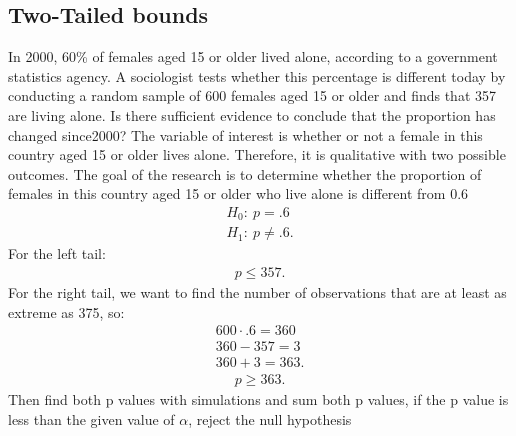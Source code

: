 \documentclass{report}
\begin{document}
    \subsection*{Two-Tailed bounds}
    \bigbreak \noindent 
    In​ 2000, 60\% of females aged 15 or older lived​ alone, according to a government statistics agency. A sociologist tests whether this percentage is different today by conducting a random sample of 600 females aged 15 or older and finds that 357 are living alone. Is there sufficient evidence to conclude that the proportion has changed since​ 2000? 
    \bigbreak \noindent 
    The variable of interest is whether or not a female in this country aged 15 or older lives alone.​ Therefore, it is qualitative with two possible outcomes.
    \bigbreak \noindent 
    The goal of the research is to determine whether the proportion of females in this country aged 15 or older who live alone is different from 0.6
    \bigbreak \noindent 
    \begin{align*}
      H_{0}:\ p = .6 \\
      H_{1}:\ p \ne .6
    .\end{align*}
    \bigbreak \noindent 
    For the left tail:
    \begin{align*}
      p \leq 357 
    .\end{align*}
    \bigbreak \noindent 
    For the right tail, we want to find the number of observations that are at least as extreme as 375, so:
    \begin{align*}
      600 \cdot .6 = 360 \\
      360 - 357 = 3 \\
      360 + 3 = 363
    .\end{align*}
    \begin{align*}
      p \geq 363
    .\end{align*}
    \bigbreak \noindent 
    Then find both p values with simulations and sum both p values, if the p value is less than the given value of $\alpha $, reject the null hypothesis

    \bigbreak \noindent \bigbreak \noindent 
\end{document}
